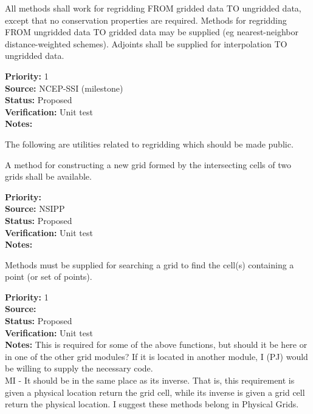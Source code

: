 
All methods shall work for regridding FROM gridded data TO ungridded 
data, except that no conservation properties are required.
Methods for regridding FROM ungridded data TO gridded data may be
supplied (eg nearest-neighbor distance-weighted schemes).
Adjoints shall be supplied for interpolation TO ungridded data.

\begin{reqlist}
{\bf Priority:} 1 \\
{\bf Source:}  NCEP-SSI (milestone) \\
{\bf Status:} Proposed \\
{\bf Verification:} Unit test \\
{\bf Notes:} 
\end{reqlist}


The following are utilities related to regridding which should be made
public.


A method for constructing a new grid formed by the intersecting
cells of two grids shall be available.

\begin{reqlist}
{\bf Priority:}  \\
{\bf Source:}  NSIPP \\
{\bf Status:} Proposed \\
{\bf Verification:} Unit test \\
{\bf Notes:} 
\end{reqlist}


Methods must be supplied for searching a grid to find the cell(s)
containing a point (or set of points).

\begin{reqlist}
{\bf Priority:} 1 \\
{\bf Source:}  \\
{\bf Status:} Proposed \\
{\bf Verification:} Unit test \\
{\bf Notes:} This is required for some of the above functions, but
             should it be here or in one of the other grid modules?
             If it is located in another module, I (PJ) would be
             willing to supply the necessary code.
             \\
             MI - It should be in the same place as its inverse.
             That is, this requirement is
             given a physical location return the grid cell,
             while its inverse is
             given a grid cell return the physical location.
             I suggest these methods belong in Physical Grids.
\end{reqlist}


